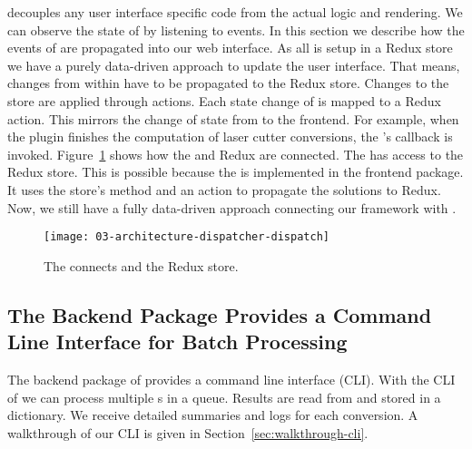 \documentclass[../../ClassicThesis.tex]{subfiles}
\begin{document}
{\convertify} decouples any user interface specific code
from the actual logic and rendering. We can observe the
state of {\convertify} by listening to events. In this
section we describe how the events of {\convertify} are
propagated into our web interface. As all {\userinterface}
is setup in a Redux store we have a purely data-driven
approach to update the user interface. That means, changes
from within {\convertify} have to be propagated to the Redux
store. Changes to the store are applied through actions.
Each state change of {\convertify} is mapped to a Redux
action. This mirrors the change of state from {\convertify}
to the frontend. For example, when the
 plugin finishes the computation of
laser cutter conversions, the 's
 callback is invoked.
Figure~\ref{fig:dispatcher-dispatch} shows how the
 and Redux are connected. The
 has access to the Redux store. This is
possible because the  is implemented in
the frontend package. It uses the store's
 method and an action to propagate the
solutions to Redux. Now, we still have a fully data-driven
approach connecting our framework with {\platener}.

\begin{figure}
  \centering
  \texttt{[image: 03-architecture-dispatcher-dispatch]}
  \caption{The  connects {\convertify} and the Redux store.}
  \label{fig:dispatcher-dispatch}
\end{figure}

\subsection{The Backend Package Provides a Command Line Interface for
  Batch Processing}
\label{sec:cli-tool}





The backend package of {\platener} provides a command line interface
(CLI). With the CLI of {\platener} we can process multiple
{\threedmodel}s in a queue. Results are read from and stored in
a dictionary. We receive detailed summaries and logs for each
conversion. A walkthrough of our CLI is given in
Section~\ref{sec:walkthrough-cli}.
\end{document}
